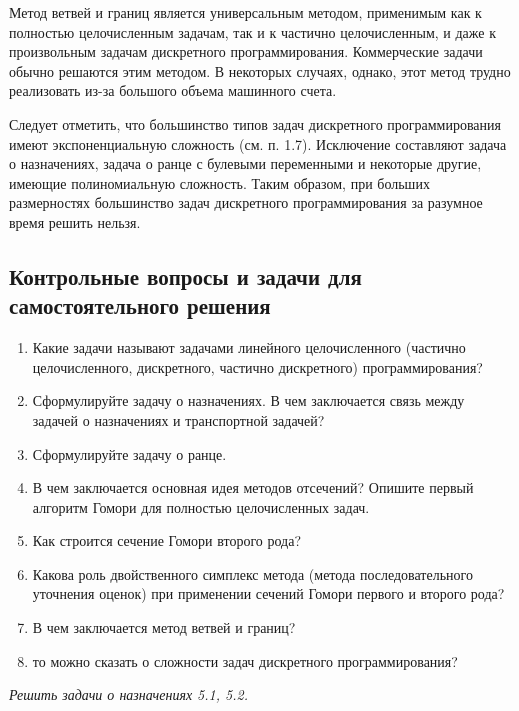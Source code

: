 Метод ветвей и границ является универсальным методом, применимым как к полностью целочисленным задачам, так и к частично целочисленным, и даже к произвольным задачам дискретного программирования. Коммерческие задачи обычно решаются этим методом. В некоторых случаях, однако, этот метод трудно реализовать из-за большого объема машинного счета.

Следует отметить, что большинство типов задач дискретного программирования имеют экспоненциальную сложность (см. п. 1.7). Исключение составляют задача о назначениях, задача о ранце с булевыми переменными и некоторые другие, имеющие полиномиальную сложность. Таким образом, при больших размерностях большинство задач дискретного программирования за разумное время решить нельзя.
\\

\subsection*{Контрольные вопросы и задачи для самостоятельного решения}

\begin{enumerate}
	\item{Какие задачи называют задачами линейного целочисленного (частично целочисленного, дискретного, частично дискретного) программирования?}
  \item{Сформулируйте задачу о назначениях. В чем заключается связь между задачей о назначениях и транспортной задачей?}
  \item{Сформулируйте задачу о ранце.}
  \item{В чем заключается основная идея методов отсечений? Опишите первый алгоритм Гомори для полностью целочисленных задач.}
  \item{Как строится сечение Гомори второго рода?}
  \item{Какова роль двойственного симплекс метода (метода последовательного уточнения оценок) при применении сечений Гомори первого и второго рода?}
  \item{В чем заключается метод ветвей и границ?}
  \item{то можно сказать о сложности задач дискретного программирования?}
\end{enumerate}

\textit{Решить задачи о назначениях 5.1, 5.2.}


